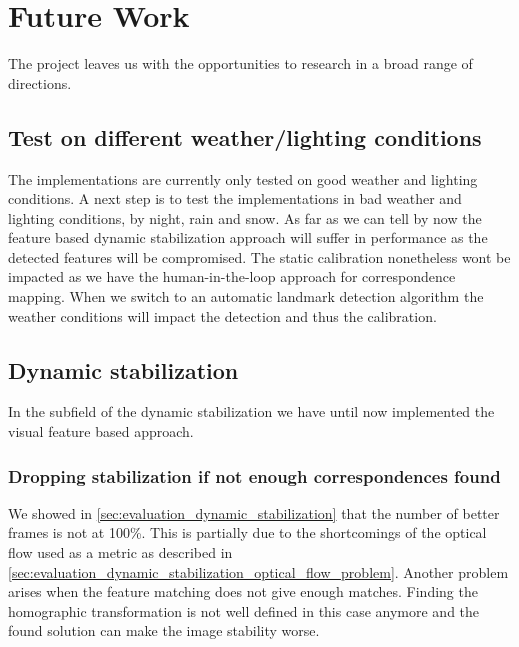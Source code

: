 
\section{Future Work}
The project leaves us with the opportunities to research in a broad range of directions.

\subsection{Test on different weather/lighting conditions}
The implementations are currently only tested on good weather and lighting conditions. 
A next step is to test the implementations in bad weather and lighting conditions, \eg by night, rain and snow.
As far as we can tell by now the feature based dynamic stabilization approach will suffer in performance as the detected features will be compromised.
The static calibration nonetheless wont be impacted as we have the human-in-the-loop approach for correspondence mapping. 
When we switch to an automatic landmark detection algorithm the weather conditions will impact the detection and thus the calibration.

\subsection{Dynamic stabilization}
In the subfield of the dynamic stabilization we have until now implemented the visual feature based approach.

\subsubsection{Dropping stabilization if not enough correspondences found}
We showed in \autoref{sec:evaluation_dynamic_stabilization} that the number of better frames is not at 100\%.
This is partially due to the shortcomings of the optical flow used as a metric as described in \autoref{sec:evaluation_dynamic_stabilization_optical_flow_problem}.
Another problem arises when the feature matching does not give enough matches. 
Finding the homographic transformation is not well defined in this case anymore and the found solution can make the image stability worse.  


